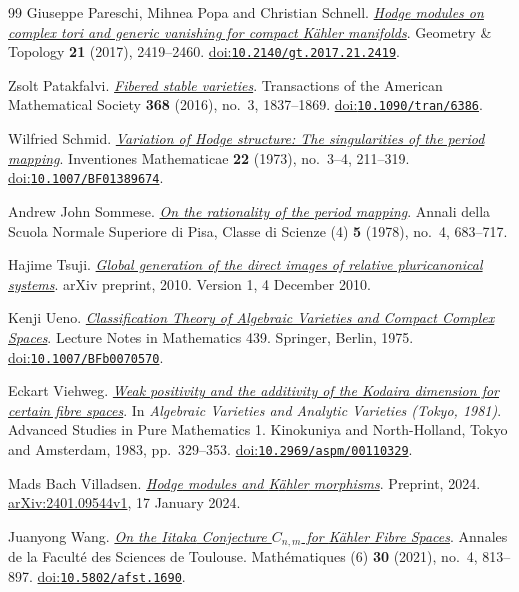 \begin{thebibliography}{99}
Giuseppe Pareschi, Mihnea Popa and Christian Schnell.
\emph{\href{https://msp.org/gt/2017/21-4/gt-v21-n4-p12-s.pdf}{{Hodge} modules on complex tori and generic vanishing for compact {K{\"a}hler} manifolds}}.
Geometry \& Topology \textbf{21} (2017), 2419--2460.
\href{https://doi.org/10.2140/gt.2017.21.2419}{doi:\nolinkurl{10.2140/gt.2017.21.2419}}.

Zsolt Patakfalvi.
\emph{\href{https://arxiv.org/abs/1208.1787v4}{Fibered stable varieties}}.
Transactions of the American Mathematical Society \textbf{368} (2016), no.~3, 1837--1869.
\href{https://doi.org/10.1090/tran/6386}{doi:\nolinkurl{10.1090/tran/6386}}.

Wilfried Schmid.
\emph{\href{https://doi.org/10.1007/BF01389674}{Variation of {Hodge} structure: The singularities of the period mapping}}.
Inventiones Mathematicae \textbf{22} (1973), no.~3--4, 211--319.
\href{https://doi.org/10.1007/BF01389674}{doi:\nolinkurl{10.1007/BF01389674}}.

Andrew John Sommese.
\emph{\href{https://www.numdam.org/item/ASNSP_1978_4_5_4_683_0/}{On the rationality of the period mapping}}.
Annali della Scuola Normale Superiore di Pisa, Classe di Scienze (4)
\textbf{5} (1978), no.~4, 683--717.

Hajime Tsuji.
\emph{\href{https://arxiv.org/abs/1012.0884v1}{Global generation of the direct images of relative pluricanonical systems}}.
arXiv preprint, 2010.
Version 1, 4 December 2010.

Kenji Ueno.
\emph{\href{https://doi.org/10.1007/BFb0070570}{Classification Theory of Algebraic Varieties and Compact Complex Spaces}}.
Lecture Notes in Mathematics 439.
Springer, Berlin, 1975.
\href{https://doi.org/10.1007/BFb0070570}{doi:\nolinkurl{10.1007/BFb0070570}}.

Eckart Viehweg.
\emph{\href{https://esaga.uni-due.de/eckart.viehweg/ecpubl/}{Weak positivity and the additivity of the {Kodaira} dimension for certain fibre spaces}}.
In \emph{Algebraic Varieties and Analytic Varieties (Tokyo, 1981)}.
Advanced Studies in Pure Mathematics 1.
Kinokuniya and North-Holland, Tokyo and Amsterdam, 1983, pp.~329--353.
\href{https://doi.org/10.2969/aspm/00110329}{doi:\nolinkurl{10.2969/aspm/00110329}}.

Mads Bach Villadsen.
\emph{\href{https://arxiv.org/abs/2401.09544v1}{{Hodge} modules and {K{\"a}hler} morphisms}}.
Preprint, 2024.
\href{https://arxiv.org/abs/2401.09544v1}{arXiv:2401.09544v1}, 17 January 2024.

Juanyong Wang.
\emph{\href{https://afst.centre-mersenne.org/item/10.5802/afst.1690.pdf}{On the {Iitaka} Conjecture {$C_{n,m}$} for {K{\"a}hler} Fibre Spaces}}.
Annales de la Facult{\'e} des Sciences de Toulouse. Math{\'e}matiques (6) \textbf{30} (2021), no.~4, 813--897.
\href{https://doi.org/10.5802/afst.1690}{doi:\nolinkurl{10.5802/afst.1690}}.

\end{thebibliography}
